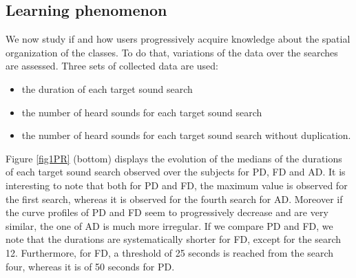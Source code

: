 \documentclass{aes2e}
\begin{document}
\newpage


\subsection{Learning phenomenon}

We now study if and how users  progressively acquire knowledge about the spatial organization of the classes. To do that, variations of the data over the searches are assessed. Three sets of collected data are used:

\begin{itemize}
\item the duration of each target sound search 
\item the number of heard sounds for each target sound search 
\item the number of heard sounds for each target sound search without duplication. 
\end{itemize}

Figure \ref{fig1PR} (bottom) displays the evolution of the medians of the durations of each target sound search observed over the subjects for PD, FD and AD. It is interesting to note that both for PD and FD, the maximum value is observed for the first search, whereas it is observed for the fourth search for AD. Moreover if the curve profiles of PD and FD  seem to progressively decrease and are very similar, the one of AD is much more irregular. If we compare PD and FD, we note  that the durations are systematically shorter for FD, except for the search 12. Furthermore, for FD, a threshold of 25 seconds is reached from the search four,  whereas it is of 50 seconds for PD. 
\end{document}
